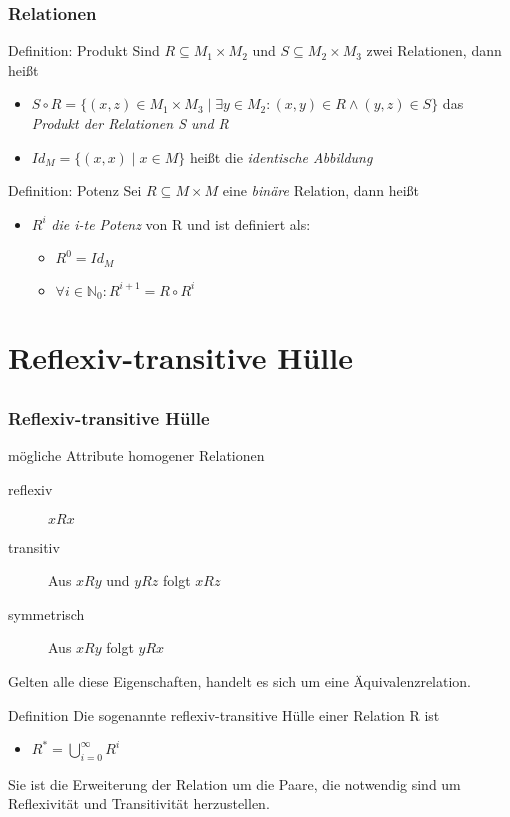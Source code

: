%

\begin{frame}
	\frametitle{Relationen}
	\begin{block}{Definition: Produkt}
		Sind $R \subseteq M_1 \times M_2$ und $S \subseteq M_2 \times M_3$ zwei Relationen, dann heißt \pause
		\begin{itemize}
			\item $S \circ R = \{(x,z) \in M_1 \times M_3 \mid \exists y \in M_2 : (x,y) \in R \wedge (y,z) \in S \} $ das {\em Produkt der Relationen S und R} \pause
			\item $Id_M = \{(x,x) \mid x \in M \}$ heißt die {\em identische Abbildung}
		\end{itemize}
	\end{block}
	\pause
	\begin{block}{Definition: Potenz}
		Sei $R \subseteq M \times M$ eine {\em binäre} Relation, dann heißt
		\begin{itemize}
			\item $R^i$ {\em die i-te Potenz} von R und ist definiert als: \pause
			\begin{itemize}
				\item $R^0=Id_M$ \pause
				\item $\forall i \in \mathbb N_0: R^{i+1}=R \circ R^i$
			\end{itemize}
		\end{itemize}
	\end{block}
\end{frame}

\section[Reflexiv-transitive Hülle]{Reflexiv-transitive Hülle}
\subsection*{}
\begin{frame}
	\frametitle{Reflexiv-transitive Hülle}

	\begin{block}{mögliche Attribute homogener Relationen}
		\begin{description}
			\item[reflexiv] $x R x$
			\item[transitiv] Aus $x R y$ und $y R z$ folgt $x R z$
			\item[symmetrisch] Aus $x R y$ folgt $y R x$
		\end{description} \pause
		Gelten alle diese Eigenschaften, handelt es sich um eine Äquivalenzrelation.
	\end{block}
		\pause
	\begin{block}{Definition}
		Die sogenannte reflexiv-transitive Hülle einer Relation R ist
		\begin{itemize}
			\item $R^* = \bigcup_{i=0}^{\infty} R^i$
		\end{itemize}
	\pause
		Sie ist die Erweiterung der Relation um die Paare, die notwendig sind um Reflexivität und Transitivität herzustellen.
	\end{block}

\end{frame}

